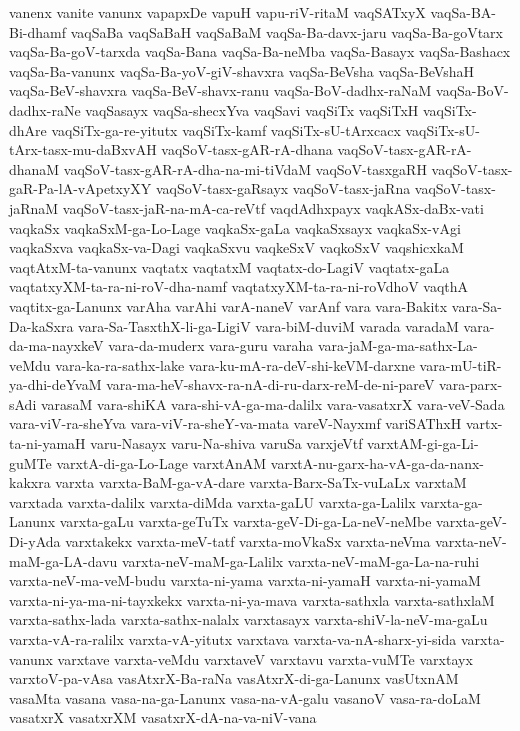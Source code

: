{vanenx
vanite
vanunx
vapapxDe
vapuH
vapu-riV-ritaM
vaqSATxyX
vaqSa-BA-Bi-dhamf
vaqSaBa
vaqSaBaH
vaqSaBaM
vaqSa-Ba-davx-jaru
vaqSa-Ba-goVtarx
vaqSa-Ba-goV-tarxda
vaqSa-Bana
vaqSa-Ba-neMba
vaqSa-Basayx
vaqSa-Bashacx
vaqSa-Ba-vanunx
vaqSa-Ba-yoV-giV-shavxra
vaqSa-BeVsha
vaqSa-BeVshaH
vaqSa-BeV-shavxra
vaqSa-BeV-shavx-ranu
vaqSa-BoV-dadhx-raNaM
vaqSa-BoV-dadhx-raNe
vaqSasayx
vaqSa-shecxYva
vaqSavi
vaqSiTx
vaqSiTxH
vaqSiTx-dhAre
vaqSiTx-ga-re-yitutx
vaqSiTx-kamf
vaqSiTx-sU-tArxcacx
vaqSiTx-sU-tArx-tasx-mu-daBxvAH
vaqSoV-tasx-gAR-rA-dhana
vaqSoV-tasx-gAR-rA-dhanaM
vaqSoV-tasx-gAR-rA-dha-na-mi-tiVdaM
vaqSoV-tasxgaRH
vaqSoV-tasx-gaR-Pa-lA-vApetxyXY
vaqSoV-tasx-gaRsayx
vaqSoV-tasx-jaRna
vaqSoV-tasx-jaRnaM
vaqSoV-tasx-jaR-na-mA-ca-reVtf
vaqdAdhxpayx
vaqkASx-daBx-vati
vaqkaSx
vaqkaSxM-ga-Lo-Lage
vaqkaSx-gaLa
vaqkaSxsayx
vaqkaSx-vAgi
vaqkaSxva
vaqkaSx-va-Dagi
vaqkaSxvu
vaqkeSxV
vaqkoSxV
vaqshicxkaM
vaqtAtxM-ta-vanunx
vaqtatx
vaqtatxM
vaqtatx-do-LagiV
vaqtatx-gaLa
vaqtatxyXM-ta-ra-ni-roV-dha-namf
vaqtatxyXM-ta-ra-ni-roVdhoV
vaqthA
vaqtitx-ga-Lanunx
varAha
varAhi
varA-naneV
varAnf
vara
vara-Bakitx
vara-Sa-Da-kaSxra
vara-Sa-TasxthX-li-ga-LigiV
vara-biM-duviM
varada
varadaM
vara-da-ma-nayxkeV
vara-da-muderx
vara-guru
varaha
vara-jaM-ga-ma-sathx-La-veMdu
vara-ka-ra-sathx-lake
vara-ku-mA-ra-deV-shi-keVM-darxne
vara-mU-tiR-ya-dhi-deYvaM
vara-ma-heV-shavx-ra-nA-di-ru-darx-reM-de-ni-pareV
vara-parx-sAdi
varasaM
vara-shiKA
vara-shi-vA-ga-ma-dalilx
vara-vasatxrX
vara-veV-Sada
vara-viV-ra-sheYva
vara-viV-ra-sheY-va-mata
vareV-Nayxmf
variSAThxH
vartx-ta-ni-yamaH
varu-Nasayx
varu-Na-shiva
varuSa
varxjeVtf
varxtAM-gi-ga-Li-guMTe
varxtA-di-ga-Lo-Lage
varxtAnAM
varxtA-nu-garx-ha-vA-ga-da-nanx-kakxra
varxta
varxta-BaM-ga-vA-dare
varxta-Barx-SaTx-vuLaLx
varxtaM
varxtada
varxta-dalilx
varxta-diMda
varxta-gaLU
varxta-ga-Lalilx
varxta-ga-Lanunx
varxta-gaLu
varxta-geTuTx
varxta-geV-Di-ga-La-neV-neMbe
varxta-geV-Di-yAda
varxtakekx
varxta-meV-tatf
varxta-moVkaSx
varxta-neVma
varxta-neV-maM-ga-LA-davu
varxta-neV-maM-ga-Lalilx
varxta-neV-maM-ga-La-na-ruhi
varxta-neV-ma-veM-budu
varxta-ni-yama
varxta-ni-yamaH
varxta-ni-yamaM
varxta-ni-ya-ma-ni-tayxkekx
varxta-ni-ya-mava
varxta-sathxla
varxta-sathxlaM
varxta-sathx-lada
varxta-sathx-nalalx
varxtasayx
varxta-shiV-la-neV-ma-gaLu
varxta-vA-ra-ralilx
varxta-vA-yitutx
varxtava
varxta-va-nA-sharx-yi-sida
varxta-vanunx
varxtave
varxta-veMdu
varxtaveV
varxtavu
varxta-vuMTe
varxtayx
varxtoV-pa-vAsa
vasAtxrX-Ba-raNa
vasAtxrX-di-ga-Lanunx
vasUtxnAM
vasaMta
vasana
vasa-na-ga-Lanunx
vasa-na-vA-galu
vasanoV
vasa-ra-doLaM
vasatxrX
vasatxrXM
vasatxrX-dA-na-va-niV-vana
}
